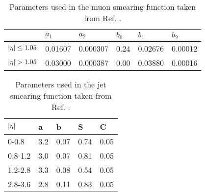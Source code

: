 
\begin{table}[H]
\renewcommand{\arraystretch}{1.5} %
\begin{center}
\begin{tabular}{|l|l|l|l|l|l|}
\hline
 &$a_1$&$a_2$&$b_0$&$b_1$&$b_2$ \\ \hline
$|\eta|\leq 1.05$&0.01607&0.000307&0.24&0.02676&0.00012 \\ \hline
$\abs{\eta}>1.05$&0.03000&0.000387&0.00&0.03880&0.00016 \\ \hline
\end{tabular}
\end{center}
\caption{Parameters used in the muon smearing function taken from Ref. \citep{ATL-PHYS-PUB-2013-004}.}
\label{tab:muonparam}
\renewcommand{\arraystretch}{1.0} %
\end{table}
\begin{table}[H]
\renewcommand{\arraystretch}{1.5} %
\begin{center}
\begin{tabular}{|l|l|l|l|l|}
\hline
$|\eta|$&a&b&S&C \\ \hline
0-0.8&3.2&0.07&0.74&0.05 \\
0.8-1.2&3.0&0.07&0.81&0.05 \\
1.2-2.8&3.3&0.08&0.54&0.05 \\
2.8-3.6&2.8&0.11&0.83&0.05 \\ \hline
\end{tabular}
\end{center}
\caption{Parameters used in the jet smearing function taken from Ref. \citep{ATL-PHYS-PUB-2013-004}.}
\label{tab:jetparam}
\renewcommand{\arraystretch}{1.0} %
\end{table}
